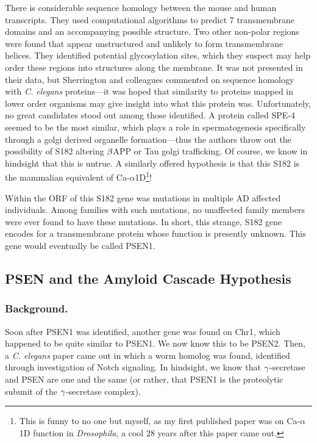 There is considerable sequence homology between the mouse and human transcripts. They used computational algorithms to predict 7 transmembrane domains and an accompanying possible structure. Two other non-polar regions were found that appear unstructured and unlikely to form transmembrane helices. They identified potential glycosylation sites, which they suspect may help order these regions into structures along the membrane. It was not presented in their data, but Sherrington and colleagues commented on sequence homology with \textit{C. elegans} proteins---it was hoped that similarity to proteins mapped in lower order organisms may give insight into what this protein was. Unfortunately, no great candidates stood out among those identified. A protein called SPE-4 seemed to be the most similar, which plays a role in spermatogenesis specifically through a golgi derived organelle formation---thus the authors throw out the possibility of S182 altering $\beta$APP or Tau golgi trafficking. Of course, we know in hindsight that this is untrue. A similarly offered hypothesis is that this S182 is the mammalian equivalent of Ca-$\alpha$1D\footnote{This is funny to no one but myself, as my first published paper was on Ca-$\alpha$1D function in \textit{Drosophila}, a cool 28 years after this paper came out.}! \newline

Within the ORF of this S182 gene was mutations in multiple AD affected individuals. Among families with such mutations, no unaffected family members were ever found to have these mutations. In short, this strange, S182 gene encodes for a transmembrane protein whose function is presently unknown. This gene would eventually be called PSEN1. 

\subsection*{PSEN and the Amyloid Cascade Hypothesis}


\subsubsection*{Background.}

Soon after PSEN1 was identified, another gene was found on Chr1, which happened to be quite similar to PSEN1. We now know this to be PSEN2. Then, a \textit{C. elegans} paper came out in which a worm homolog was found, identified through investigation of Notch signaling. In hindsight, we know that $\gamma$-secretase and PSEN are one and the same (or rather, that PSEN1 is the proteolytic subunit of the $\gamma$-secretase complex).\newline

